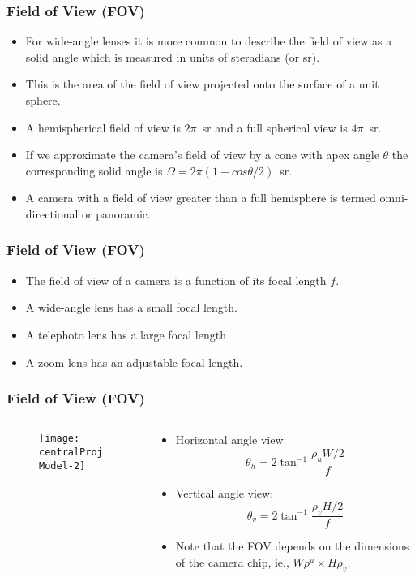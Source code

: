 \begin{frame}
\frametitle{Field of View (FOV)}
\begin{itemize}
\item For wide-angle lenses it is more common to describe the field of view as a solid angle which is measured in units of steradians (or sr).
\item This is the area of the field of view projected onto the surface of a unit sphere.
\item A hemispherical field of view is $2\pi$~sr and a full spherical view is $4\pi$~sr.
\item If we approximate the camera's field of view by a cone with apex angle $\theta$ the corresponding solid angle is $\Omega = 2\pi(1-cos\theta/2)$~sr.
\item A camera with a field of view greater than a full hemisphere is termed omni-directional or panoramic.
\end{itemize}
\end{frame}

\begin{frame}
\frametitle{Field of View (FOV)}
\begin{itemize}
\item The field of view of a camera is a function of its focal length $f$.
\item A wide-angle lens has a small focal length.
\item A telephoto lens has a large focal length
\item A zoom lens has an adjustable focal length. 
\end{itemize}
\end{frame}

\begin{frame}
\frametitle{Field of View (FOV)}
\begin{columns}
\begin{column}{.5\textwidth}
\begin{figure}[!h]
\centering
\texttt{[image: centralProjModel-2]}
\end{figure}
\end{column}
\begin{column}{.5\textwidth}
\begin{itemize}
\item Horizontal angle view:
\[
\theta_{h} = 2 \tan^{-1} \dfrac{\rho_u W/2}{f}
\]
\item Vertical angle view:
\[
\theta_{v} = 2 \tan^{-1} \dfrac{\rho_v H/2}{f}
\]
\item Note that the FOV depends on the dimensions of the camera chip, ie., $W\rho^{u} \times H\rho_{v}$.
\end{itemize}
\end{column}
\end{columns}
\end{frame}



